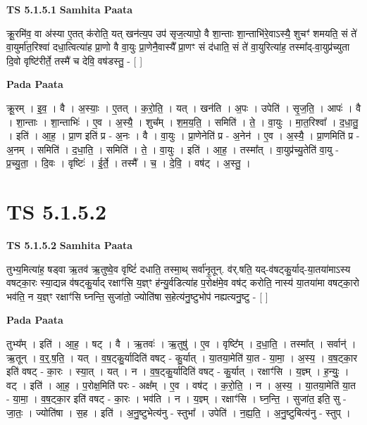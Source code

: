\documentclass[17pt]{extarticle}
\begin{document}
\textbf{TS 5.1.5.1 } \newline
\textbf{Samhita Paata} \newline

क्रू॒रमि॑व॒ वा अ॑स्या ए॒तत् क॑रोति॒ यत् खन॑त्य॒प उप॑ सृज॒त्यापो॒ वै शा॒न्ताः शा॒न्ताभि॑रे॒वाऽस्यै॒ शुचꣳ॑ शमयति॒ सं ते॑ वा॒युर्मा॑त॒रिश्वा॑ दधा॒त्वित्या॑ह प्रा॒णो वै वा॒युः प्रा॒णेनै॒वास्यै᳚ प्रा॒णꣳ सं द॑धाति॒ सं ते॑ वा॒युरित्या॑ह॒ तस्मा᳚द्-वा॒युप्र॑च्युता दि॒वो वृष्टि॑रीर्ते॒ तस्मै॑ च देवि॒ वष॑डस्तु॒ - [  ] \newline

\textbf{Pada Paata} \newline

क्रू॒रम् । इ॒व॒ । वै । अ॒स्याः॒ । ए॒तत् । क॒रो॒ति॒ । यत् । खन॑ति । अ॒पः । उपेति॑ । सृ॒ज॒ति॒ । आपः॑ । वै । शा॒न्ताः । शा॒न्ताभिः॑ । ए॒व । अ॒स्यै॒ । शुच᳚म् । श॒म॒य॒ति॒ । समिति॑ । ते॒ । वा॒युः । मा॒त॒रिश्वा᳚ । द॒धा॒तु॒ । इति॑ । आ॒ह॒ । प्रा॒ण इति॑ प्र - अ॒नः । वै । वा॒युः । प्रा॒णेनेति॑ प्र - अ॒नेन॑ । ए॒व । अ॒स्यै॒ । प्रा॒णमिति॑ प्र - अ॒नम् । समिति॑ । द॒धा॒ति॒ । समिति॑ । ते॒ । वा॒युः । इति॑ । आ॒ह॒ । तस्मा᳚त् । वा॒युप्र॑च्यु॒तेति॑ वा॒यु - प्र॒च्यु॒ता॒ । दि॒वः । वृष्टिः॑ । ई॒र्ते॒ । तस्मै᳚ । च॒ । दे॒वि॒ । वष॑ट् । अ॒स्तु॒ ।  \newline




\section*{ TS 5.1.5.2 }

\textbf{TS 5.1.5.2 } \newline
\textbf{Samhita Paata} \newline

तुभ्य॒मित्या॑ह॒ षड्वा ऋ॒तव॑ ऋ॒तुष्वे॒व वृष्टिं॑ दधाति॒ तस्मा॒थ् सर्वा॑नृ॒तून्. व॑र्.षति॒ यद्-व॑षट्कु॒र्याद्-या॒तया॑माऽस्य वषट्का॒रः स्या॒द्यन्न व॑षट्कु॒र्याद् रक्षाꣳ॑सि य॒ज्ञ्ꣳ ह॑न्यु॒र्वडित्या॑ह प॒रोक्ष॑मे॒व वष॑ट् करोति॒ नास्य॑ या॒तया॑मा वषट्का॒रो भव॑ति॒ न य॒ज्ञ्ꣳ रक्षाꣳ॑सि घ्नन्ति॒ सुजा॑तो॒ ज्योति॑षा स॒हेत्य॑नु॒ष्टुभोप॑ नह्यत्यनु॒ष्टु - [  ] \newline

\textbf{Pada Paata} \newline

तुभ्य᳚म् । इति॑ । आ॒ह॒ । षट् । वै । ऋ॒तवः॑ । ऋ॒तुषु॑ । ए॒व । वृष्टि᳚म् । द॒धा॒ति॒ । तस्मा᳚त् । सर्वान्॑ । ऋ॒तून् । व॒र्॒.ष॒ति॒ । यत् । व॒ष॒ट्कु॒र्यादिति॑ वषट् - कु॒र्यात् । या॒तया॒मेति॑ या॒त - या॒मा॒ । अ॒स्य॒ । व॒ष॒ट्का॒र इति॑ वषट् - का॒रः । स्या॒त् । यत् । न । व॒ष॒ट्कु॒र्यादिति॑ वषट् - कु॒र्यात् । रक्षाꣳ॑सि । य॒ज्ञ्म् । ह॒न्युः॒ । वट् । इति॑ । आ॒ह॒ । प॒रोक्ष॒मिति॑ परः - अक्ष᳚म् । ए॒व । वष॑ट् । क॒रो॒ति॒ । न । अ॒स्य॒ । या॒तया॒मेति॑ या॒त - या॒मा॒ । व॒ष॒ट्का॒र इति॑ वषट् - का॒रः । भव॑ति । न । य॒ज्ञ्म् । रक्षाꣳ॑सि । घ्न॒न्ति॒ । सुजा॑त॒ इति॒ सु - जा॒तः॒ । ज्योति॑षा । स॒ह । इति॑ । अ॒नु॒ष्टुभेत्य॑नु - स्तुभा᳚ । उपेति॑ । न॒ह्य॒ति॒ । अ॒नु॒ष्टुबित्य॑नु - स्तुप् ।  \newline
\end{document}
